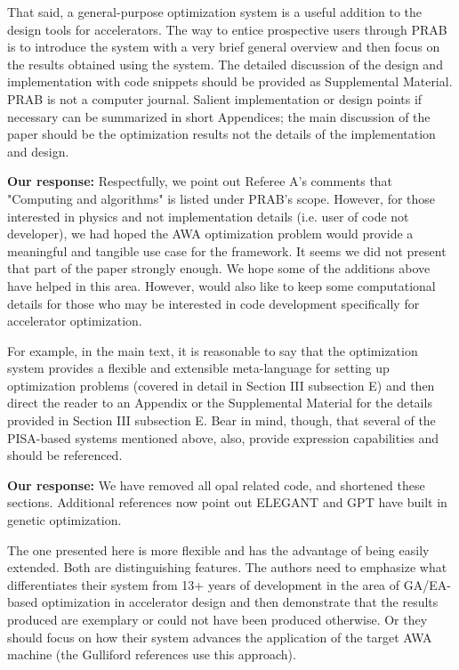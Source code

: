 \documentclass{article}
\begin{document}
That said, a general-purpose optimization system is a useful addition
to the design tools for accelerators. The way to entice prospective
users through PRAB is to introduce the system with a very brief
general overview and then focus on the results obtained using the
system. The detailed discussion of the design and implementation with
code snippets should be provided as Supplemental Material. PRAB is not
a computer journal. Salient implementation or design points if
necessary can be summarized in short Appendices; the main discussion
of the paper should be the optimization results not the details of the
implementation and design. 

{\bf Our response:} {\color{blue} 
	Respectfully, we point out Referee A's comments that 
	"Computing and algorithms" is listed under PRAB's scope. 
	However, for those interested in physics and not implementation details (i.e. user of code not developer), 
	we had hoped the AWA optimization problem would 
	provide a meaningful and tangible use case for the framework.
	It seems we did not present that part of the paper strongly enough. 
	We hope some of the additions above have helped in this area.
	However, would also like to keep some computational details for those who 
	may be interested in code development specifically for accelerator optimization.
}


For example, in the main text, it is
reasonable to say that the optimization system provides a flexible and
extensible meta-language for setting up optimization problems (covered
in detail in Section III subsection E) and then direct the reader to
an Appendix or the Supplemental Material for the details provided in
Section III subsection E. Bear in mind, though, that several of the
PISA-based systems mentioned above, also, provide expression
capabilities and should be referenced. 

{\bf Our response:}{\color{blue} 	
	We have removed all opal related code, and shortened these sections.
	Additional references now point out ELEGANT and GPT have built in genetic optimization.
}

The one presented here is more
flexible and has the advantage of being easily extended. Both are
distinguishing features. The authors need to emphasize what
differentiates their system from 13+ years of development in the area
of GA/EA-based optimization in accelerator design and then demonstrate
that the results produced are exemplary or could not have been
produced otherwise. Or they should focus on how their system advances
the application of the target AWA machine (the Gulliford references
use this approach).
\end{document}
